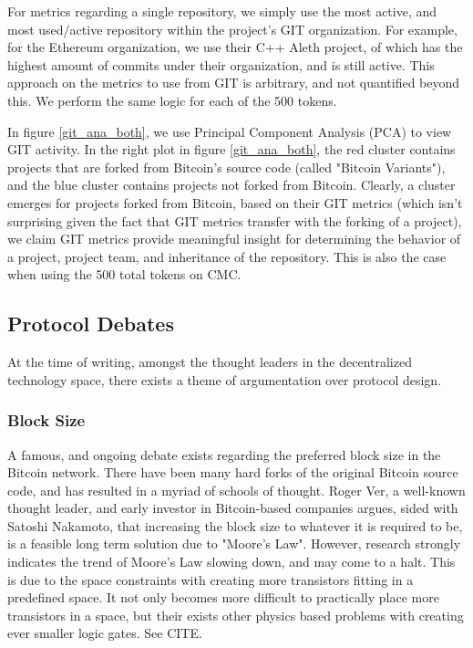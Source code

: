 \documentclass[12pt, titlepage, twocolumn]{report}
\begin{document}
For metrics regarding a single repository, we simply use the most active, and most used/active repository within the project's GIT organization. For example, for the Ethereum organization, we use their C++ Aleth project, of which has the highest amount of commits under their organization, and is still active. This approach on the metrics to use from GIT is arbitrary, and not quantified beyond this. We perform the same logic for each of the 500 tokens. 

In figure \ref{git_ana_both}, we use Principal Component Analysis (PCA) to view GIT activity. In the right plot in figure \ref{git_ana_both}, the red cluster contains projects that are forked from Bitcoin's source code (called "Bitcoin Variants"), and the blue cluster contains projects not forked from Bitcoin. Clearly, a cluster emerges for projects forked from Bitcoin, based on their GIT metrics (which isn't surprising given the fact that GIT metrics transfer with the forking of a project), we claim GIT metrics provide meaningful insight for determining the behavior of a project, project team, and inheritance of the repository. This is also the case when using the 500 total tokens on CMC.

\subsection{Protocol Debates}
At the time of writing, amongst the thought leaders in the decentralized technology space, there exists a theme of argumentation over protocol design. 

\subsubsection{Block Size}
A famous, and ongoing debate exists regarding the preferred block size in the Bitcoin network. There have been many hard forks of the original Bitcoin source code, and has resulted in a myriad of schools of thought. Roger Ver, a well-known thought leader, and early investor in Bitcoin-based companies argues, sided with Satoshi Nakamoto, that increasing the block size to whatever it is required to be, is a feasible long term solution due to "Moore's Law". However, research strongly indicates the trend of Moore's Law slowing down, and may come to a halt. This is due to the space constraints with creating more transistors fitting in a predefined space. It not only becomes more difficult to practically place more transistors in a space, but their exists other physics based problems with creating ever smaller logic gates. See CITE. 
\end{document}
